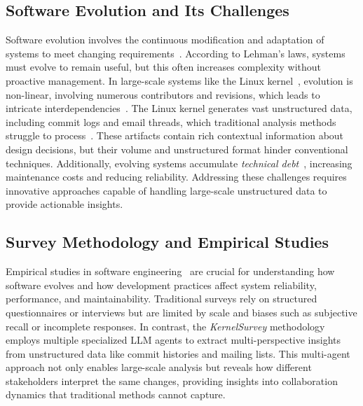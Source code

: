 \documentclass[sigconf,review,anonymous]{acmart}
\begin{document}
\subsection{Software Evolution and Its Challenges}
Software evolution involves the continuous modification and adaptation of systems to meet changing requirements~\cite{lehman1996laws}. According to Lehman's laws, systems must evolve to remain useful, but this often increases complexity without proactive management. In large-scale systems like the Linux kernel~\cite{linux}, evolution is non-linear, involving numerous contributors and revisions, which leads to intricate interdependencies~\cite{israeli2010linux}. The Linux kernel generates vast unstructured data, including commit logs and email threads, which traditional analysis methods struggle to process~\cite{mens2008introduction}. These artifacts contain rich contextual information about design decisions, but their volume and unstructured format hinder conventional techniques. Additionally, evolving systems accumulate \emph{technical debt}~\cite{brown2010managing}, increasing maintenance costs and reducing reliability. Addressing these challenges requires innovative approaches capable of handling large-scale unstructured data to provide actionable insights.



\subsection{Survey Methodology and Empirical Studies}

Empirical studies in software engineering~\cite{perry2000empirical} are crucial for understanding how software evolves and how development practices affect system reliability, performance, and maintainability. Traditional surveys rely on structured questionnaires or interviews but are limited by scale and biases such as subjective recall or incomplete responses. In contrast, the \textit{KernelSurvey} methodology employs multiple specialized LLM agents to extract multi-perspective insights from unstructured data like commit histories and mailing lists. This multi-agent approach not only enables large-scale analysis but reveals how different stakeholders interpret the same changes, providing insights into collaboration dynamics that traditional methods cannot capture.
\end{document}
